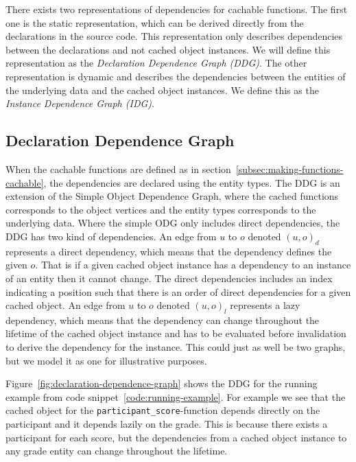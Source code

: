 
There exists two representations of dependencies for cachable functions. The first one is the static representation, which can be derived directly from the declarations in the source code. This representation only describes dependencies between the declarations and not cached object instances. We will define this representation as the \emph{Declaration Dependence Graph (DDG)}. The other representation is dynamic and describes the dependencies between the entities of the underlying data and the cached object instances. We define this as the \emph{Instance Dependence Graph (IDG)}.

\subsection{Declaration Dependence Graph}
\label{subsec:declaration-dependence-graph}

When the cachable functions are defined as in section~\ref{subsec:making-functions-cachable}, the dependencies are declared using the entity types. The DDG is an extension of the Simple Object Dependence Graph, where the cached functions corresponds to the object vertices and the entity types corresponds to the underlying data. Where the simple ODG only includes direct dependencies, the DDG has two kind of dependencies. An edge from $u$ to $o$ denoted $(u, o)_d$ represents a direct dependency, which means that the dependency defines the given $o$. That is if a given cached object instance has a dependency to an instance of an entity then it cannot change. The direct dependencies includes an index indicating a position such that there is an order of direct dependencies for a given cached object. An edge from $u$ to $o$ denoted $(u, o)_l$ represents a lazy dependency, which means that the dependency can change throughout the lifetime of the cached object instance and has to be evaluated before invalidation to derive the dependency for the instance. This could just as well be two graphs, but we model it as one for illustrative purposes.

Figure~\ref{fig:declaration-dependence-graph} shows the DDG for the running example from code snippet~\ref{code:running-example}. For example we see that the cached object for the \verb$participant_score$-function depends directly on the participant and it depends lazily on the grade. This is because there exists a participant for each score, but the dependencies from a cached object instance to any grade entity can change throughout the lifetime.

